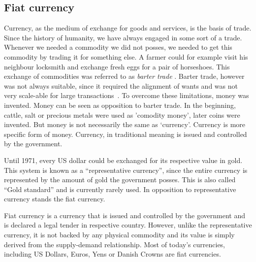 \subsection{Fiat  currency}
% 
Currency, as the medium of exchange for goods and services, is the basis of trade. Since the history of humanity, we have always engaged in some sort of a trade. Whenever we needed a commodity we did not posses, we needed to get this commodity by trading it for something else. A farmer could for example visit his neighbour locksmith and exchange fresh eggs for a pair of horseshoes. This exchange of commodities was referred to as \textit{barter trade} \cite{Sullivan2009BarterEconomics}. Barter trade, however was not always suitable, since it required the alignment of wants and was not very scale-able for large transactions~\cite{Carroll2015CreatingExchange}. To overcome these limitations, money was invented. Money can be seen as opposition to barter trade. In the beginning, cattle, salt or precious metals were used as 'comodity money', later coins were invented. But money is not necessarily the same as `currency'.  Currency is more specific form of money. Currency, in traditional meaning is issued and controlled by the government\footnotemark.
% 

Until 1971, every US dollar could be exchanged for its respective value in gold. This system is known as a ``representative currency'', since the entire currency is represented by the amount of gold the government posses. This is also called ``Gold standard'' and is currently rarely used. In opposition to representative currency stands the fiat currency. 

Fiat currency is a currency that is issued and controlled by the government and is declared a legal tender in respective country. However, unlike the representative currency, it is not backed by any physical commodity and its value is simply derived from the supply-demand relationship\footnotemark. Most of today's currencies, including US Dollars, Euros, Yens or Danish Crowns are fiat currencies.
% 
